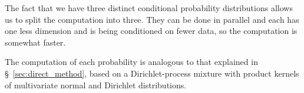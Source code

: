 \documentclass[\ifafour a4paper,12pt,\else a5paper,10pt,\fi%
onecolumn,oneside,article,%
british%
]{memoir}
\theoremstyle{remark}
\theoremstyle{innote}
\renewcommand*{\|}[1][]{\nonscript\:#1\vert\nonscript\:\mathopen{}}
\renewcommand*{\=}{\TextOrMath\texteq\eq}
\newcommand*{\sect}{\S}%
\begin{document}
The fact that we have three distinct conditional probability distributions
allows us to split the computation into three. They can be done in parallel
and each has one less dimension and is being conditioned on fewer data, so
the computation is somewhat faster.

The computation of each probability is analogous to that explained in
\sect~\ref{sec:direct_method}, based on a Dirichlet-process mixture with
product kernels of multivariate normal and Dirichlet distributions.


\end{document}

